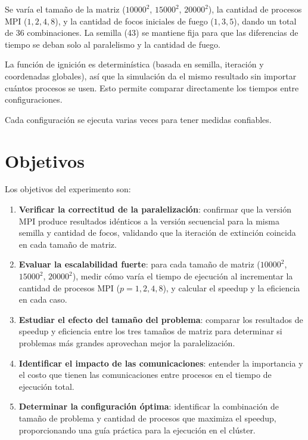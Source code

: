\documentclass[12pt, a4paper]{article}
\begin{document}
Se varía el tamaño de la matriz ($10000^2$, $15000^2$, $20000^2$), la cantidad de procesos MPI ($1, 2, 4, 8$), y la cantidad de focos iniciales de fuego ($1, 3, 5$), dando un total de 36 combinaciones. La semilla (43) se mantiene fija para que las diferencias de tiempo se deban solo al paralelismo y la cantidad de fuego.

La función de ignición es determinística (basada en semilla, iteración y coordenadas globales), así que la simulación da el mismo resultado sin importar cuántos procesos se usen. Esto permite comparar directamente los tiempos entre configuraciones.

Cada configuración se ejecuta varias veces para tener medidas confiables.

\section{Objetivos}

Los objetivos del experimento son:

\begin{enumerate}
    \item \textbf{Verificar la correctitud de la paralelización}: confirmar que la versión MPI produce resultados idénticos a la versión secuencial para la misma semilla y cantidad de focos, validando que la iteración de extinción coincida en cada tamaño de matriz.

    \item \textbf{Evaluar la escalabilidad fuerte}: para cada tamaño de matriz ($10000^2$, $15000^2$, $20000^2$), medir cómo varía el tiempo de ejecución al incrementar la cantidad de procesos MPI ($p = 1, 2, 4, 8$), y calcular el speedup y la eficiencia en cada caso.

    \item \textbf{Estudiar el efecto del tamaño del problema}: comparar los resultados de speedup y eficiencia entre los tres tamaños de matriz para determinar si problemas más grandes aprovechan mejor la paralelización.

    \item \textbf{Identificar el impacto de las comunicaciones}: entender la importancia y el costo que tienen las comunicaciones entre procesos en el tiempo de ejecución total.

    \item \textbf{Determinar la configuración óptima}: identificar la combinación de tamaño de problema y cantidad de procesos que maximiza el speedup, proporcionando una guía práctica para la ejecución en el clúster.
\end{enumerate}
\end{document}
